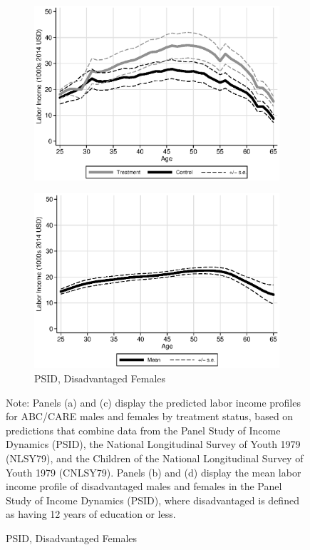 \begin{figure}
\begin{subfigure}[h]{0.4\textwidth}
		\includegraphics[width=\textwidth]{output/labor_25-60_female_2.eps}
\end{subfigure}%
\begin{subfigure}[h]{0.4\textwidth}
	\centering
	\caption{PSID, Disadvantaged Females} \label{fig:psid0}
		\includegraphics[width=\textwidth]{output/psid_incomeprofiles_s0.eps}
\end{subfigure}
\footnotesize \justify
Note: Panels (a) and (c) display the predicted labor income profiles for ABC/CARE males and females by treatment status, based on predictions that combine data from the Panel Study of Income Dynamics (PSID), the National Longitudinal Survey of Youth 1979 (NLSY79), and the Children of the National Longitudinal Survey of Youth 1979 (CNLSY79). Panels (b) and (d) display the mean labor income profile of disadvantaged males and females in the Panel Study of Income Dynamics (PSID), where disadvantaged is defined as having 12 years of education or less.\\
\end{figure}

